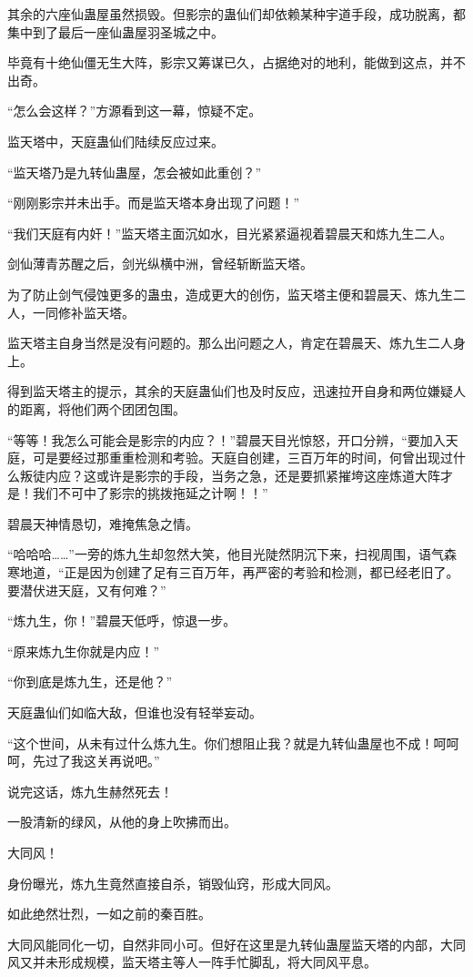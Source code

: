\begin{this_body}
其余的六座仙蛊屋虽然损毁。但影宗的蛊仙们却依赖某种宇道手段，成功脱离，都集中到了最后一座仙蛊屋羽圣城之中。

毕竟有十绝仙僵无生大阵，影宗又筹谋已久，占据绝对的地利，能做到这点，并不出奇。

“怎么会这样？”方源看到这一幕，惊疑不定。

监天塔中，天庭蛊仙们陆续反应过来。

“监天塔乃是九转仙蛊屋，怎会被如此重创？”

“刚刚影宗并未出手。而是监天塔本身出现了问题！”

“我们天庭有内奸！”监天塔主面沉如水，目光紧紧逼视着碧晨天和炼九生二人。

剑仙薄青苏醒之后，剑光纵横中洲，曾经斩断监天塔。

为了防止剑气侵蚀更多的蛊虫，造成更大的创伤，监天塔主便和碧晨天、炼九生二人，一同修补监天塔。

监天塔主自身当然是没有问题的。那么出问题之人，肯定在碧晨天、炼九生二人身上。

得到监天塔主的提示，其余的天庭蛊仙们也及时反应，迅速拉开自身和两位嫌疑人的距离，将他们两个团团包围。

“等等！我怎么可能会是影宗的内应？！”碧晨天目光惊怒，开口分辨，“要加入天庭，可是要经过那重重检测和考验。天庭自创建，三百万年的时间，何曾出现过什么叛徒内应？这或许是影宗的手段，当务之急，还是要抓紧摧垮这座炼道大阵才是！我们不可中了影宗的挑拨拖延之计啊！！”

碧晨天神情恳切，难掩焦急之情。

“哈哈哈……”一旁的炼九生却忽然大笑，他目光陡然阴沉下来，扫视周围，语气森寒地道，“正是因为创建了足有三百万年，再严密的考验和检测，都已经老旧了。要潜伏进天庭，又有何难？”

“炼九生，你！”碧晨天低呼，惊退一步。

“原来炼九生你就是内应！”

“你到底是炼九生，还是他？”

天庭蛊仙们如临大敌，但谁也没有轻举妄动。

“这个世间，从未有过什么炼九生。你们想阻止我？就是九转仙蛊屋也不成！呵呵呵，先过了我这关再说吧。”

说完这话，炼九生赫然死去！

一股清新的绿风，从他的身上吹拂而出。

大同风！

身份曝光，炼九生竟然直接自杀，销毁仙窍，形成大同风。

如此绝然壮烈，一如之前的秦百胜。

大同风能同化一切，自然非同小可。但好在这里是九转仙蛊屋监天塔的内部，大同风又并未形成规模，监天塔主等人一阵手忙脚乱，将大同风平息。


\end{this_body}
